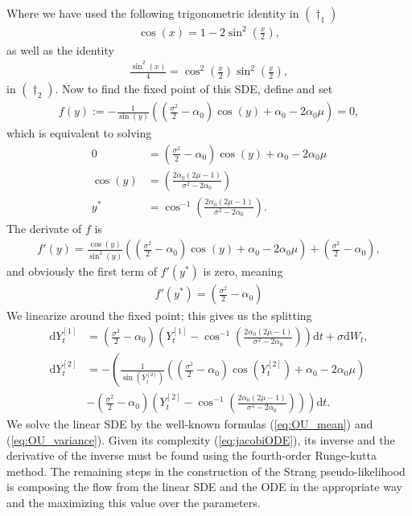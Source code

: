 Where we have used the following trigonometric identity in $(\dagger_1)$
\begin{align*}
    \cos(x) = 1 - 2 \sin^2\left(\frac{x}{2}\right),
\end{align*}
as well as the identity
\begin{align*}
    \frac{\sin^2(x)}{4} = \cos^2\left(\frac{x}{2}\right)\sin^2\left(\frac{x}{2}\right),
\end{align*}
in $(\dagger_2)$. Now to find the fixed point of this SDE, define and set
\begin{align}
    f(y) := -\frac{1}{\sin\left(y\right)}\left(\left(\frac{\sigma^2}{2}-\alpha_0\right)\cos(y) + \alpha_0 - 2\alpha_0\mu\right) = 0,
\end{align}
which is equivalent to solving
\begin{align}
    0 &= \left(\frac{\sigma^2}{2}-\alpha_0\right)\cos(y) + \alpha_0 - 2\alpha_0\mu \nonumber\\
    \cos(y) &= \left(\frac{2\alpha_0\left(2\mu - 1\right)}{\sigma^2 - 2\alpha_0}\right) \nonumber\\
    y^* &= \cos^{-1}\left(\frac{2\alpha_0\left(2\mu - 1\right)}{\sigma^2 - 2\alpha_0}\right).
\end{align}
The derivate of $f$ is
\begin{align}
    f'(y) = \frac{\cos(y)}{\sin^2\left(y\right)}\left(\left(\frac{\sigma^2}{2}-\alpha_0\right)\cos(y) + \alpha_0 - 2\alpha_0\mu\right) + \left(\frac{\sigma^2}{2}-\alpha_0\right),
\end{align}
and obviously the first term of $f'(y^*)$ is zero, meaning
\begin{align}
    f'(y^*) = \left(\frac{\sigma^2}{2}-\alpha_0\right)
\end{align}
We linearize around the fixed point; this gives us the splitting
\begin{align}
    \mathrm{d}Y_t^{[1]} &= \left(\frac{\sigma^2}{2} - \alpha_0\right)\left(Y_t^{[1]} - \cos^{-1}\left(\frac{2\alpha_0\left(2\mu - 1\right)}{\sigma^2 - 2\alpha_0}\right)\right)\mathrm{d}t + \sigma \mathrm{d}W_t,\\
    \mathrm{d}Y_t^{[2]} &= -\left(\frac{1}{\sin\left(Y_t^{[2]}\right)}\left(\left(\frac{\sigma^2}{2}-\alpha_0\right)\cos(Y_t^{[2]}) + \alpha_0 - 2\alpha_0\mu\right) \right. \nonumber \\
    &- \left. \left(\frac{\sigma^2}{2} - \alpha_0\right)\left(Y_t^{[2]} - \cos^{-1}\left(\frac{2\alpha_0\left(2\mu - 1\right)}{\sigma^2 - 2\alpha_0}\right)\right) \right)\mathrm{d}t. \label{eq:jacobiODE}
\end{align}
We solve the linear SDE by the well-known formulas (\ref{eq:OU_mean}) and (\ref{eq:OU_variance}). Given its complexity (\ref{eq:jacobiODE}), its inverse and the derivative of the inverse must be found using the fourth-order Runge-kutta method. The remaining steps in the construction of the Strang pseudo-likelihood is composing the flow from the linear SDE and the ODE in the appropriate way and the maximizing this value over the parameters.
